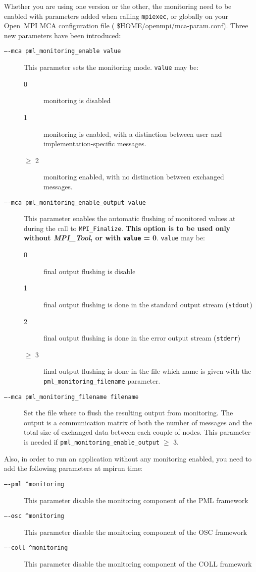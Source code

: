 \documentclass[notitlepage]{article}
\newcommand{\mpit}[1]{\textit{MPI\_Tool#1}}
\begin{document}
Whether you are using one version or the other, the monitoring need to
be enabled with parameters added when calling \texttt{mpiexec}, or globally
on your Open~MPI MCA configuration file ( \${HOME}/openmpi/mca-param.conf).
Three new parameters have been introduced:
\begin{description}
\item [\texttt{----mca pml\_monitoring\_enable value}] This parameter
  sets the monitoring mode. \texttt{value} may be:
  \begin{description}
  \item [0] monitoring is disabled
  \item [1] monitoring is enabled, with a distinction between user and
    implementation-specific messages.
  \item [$\ge$ 2] monitoring enabled, with no distinction between
    exchanged messages.
  \end{description}
\item [\texttt{----mca pml\_monitoring\_enable\_output value}] This
  parameter enables the automatic flushing of monitored values at
  during the call to \texttt{MPI\_Finalize}. {\bf This option is to be
    used only without \mpit{}, or with \texttt{value} =
    0}. \texttt{value} may be:
  \begin{description}
  \item [0] final output flushing is disable
  \item [1] final output flushing is done in the standard output stream (\texttt{stdout})
  \item [2] final output flushing is done in the error output stream (\texttt{stderr})
  \item [$\ge$ 3] final output flushing is done in the file which name
    is given with the \texttt{pml\_monitoring\_filename} parameter.
  \end{description}
\item [\texttt{----mca pml\_monitoring\_filename filename}] Set the
  file where to flush the resulting output from monitoring. The output
  is a communication matrix of both the number of messages and the
  total size of exchanged data between each couple of nodes. This
  parameter is needed if \texttt{pml\_monitoring\_enable\_output}
  $\ge$ 3.
\end{description}

Also, in order to run an application without any monitoring enabled,
you need to add the following parameters at mpirun time:
\begin{description}
\item [\texttt{----pml ^monitoring}] This parameter disable the
  monitoring component of the PML framework
\item [\texttt{----osc ^monitoring}] This parameter disable the
  monitoring component of the OSC framework
\item [\texttt{----coll ^monitoring}] This parameter disable the
    monitoring component of the COLL framework
\end{description}
\end{document}
